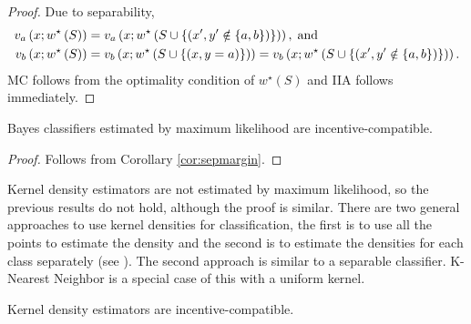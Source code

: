 \documentclass{article}
\begin{document}
\begin{proof} \label{proof:sepmarginpf} 
Due to separability,
\begin{align*}
v_{a}\left(x; w^\star \left(S\right)\right) &= v_{a}\left(x; w^\star \left(S \cup \left\{\left(x', y' \notin \left\{a, b\right\}\right)\right\}\right)\right), \text{\;and\;}
\\ v_{b}\left(x; w^\star \left(S\right)\right) &= v_{b}\left(x; w^\star \left(S \cup \left\{\left(x, y = a\right)\right\}\right)\right) = v_{b}\left(x; w^\star \left(S \cup \left\{\left(x', y' \notin \left\{a, b\right\}\right)\right\}\right)\right).
\end{align*}
MC follows from the optimality condition of $w^\star \left(S\right)$ and IIA follows immediately.
\newline \newline\end{proof}
\begin{cor} \label{cor:bc} 
Bayes classifiers estimated by maximum likelihood are incentive-compatible.
\end{cor}
\begin{proof} \label{proof:bcpf} 
Follows from Corollary \ref{cor:sepmargin}.
\newline \newline\end{proof}
Kernel density estimators are not estimated by maximum likelihood, so the previous results do not hold, although the proof is similar. There are two general approaches to use kernel densities for classification, the first is to use all the points to estimate the density and the second is to estimate the densities for each class separately (see \citet*{taylor1997classification}). The second approach is similar to a separable classifier. K-Nearest Neighbor is a special case of this with a uniform kernel.
\newline \newline
\begin{cor} \label{cor:kde} 
Kernel density estimators are incentive-compatible.
\end{cor}
\end{document}
